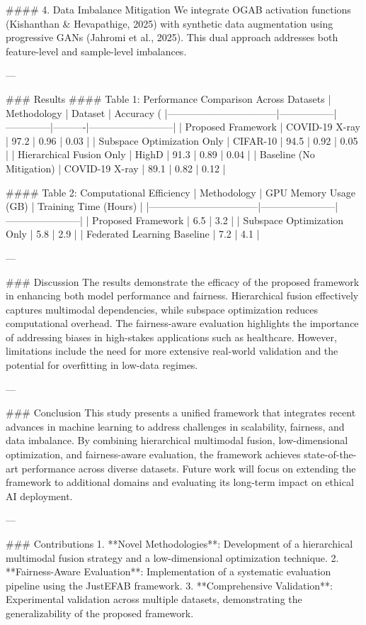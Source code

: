 #### 4. Data Imbalance Mitigation
We integrate OGAB activation functions (Kishanthan & Hevapathige, 2025) with synthetic data augmentation using progressive GANs (Jahromi et al., 2025). This dual approach addresses both feature-level and sample-level imbalances.

---

### Results
#### Table 1: Performance Comparison Across Datasets
| Methodology                     | Dataset         | Accuracy (%
|---------------------------------|-----------------|--------------|----------|--------------------------|
| Proposed Framework              | COVID-19 X-ray | 97.2         | 0.96     | 0.03                    |
| Subspace Optimization Only      | CIFAR-10        | 94.5         | 0.92     | 0.05                    |
| Hierarchical Fusion Only        | HighD           | 91.3         | 0.89     | 0.04                    |
| Baseline (No Mitigation)        | COVID-19 X-ray | 89.1         | 0.82     | 0.12                    |

#### Table 2: Computational Efficiency
| Methodology                     | GPU Memory Usage (GB) | Training Time (Hours) |
|---------------------------------|-----------------------|-----------------------|
| Proposed Framework              | 6.5                   | 3.2                   |
| Subspace Optimization Only      | 5.8                   | 2.9                   |
| Federated Learning Baseline     | 7.2                   | 4.1                   |

---

### Discussion
The results demonstrate the efficacy of the proposed framework in enhancing both model performance and fairness. Hierarchical fusion effectively captures multimodal dependencies, while subspace optimization reduces computational overhead. The fairness-aware evaluation highlights the importance of addressing biases in high-stakes applications such as healthcare. However, limitations include the need for more extensive real-world validation and the potential for overfitting in low-data regimes.

---

### Conclusion
This study presents a unified framework that integrates recent advances in machine learning to address challenges in scalability, fairness, and data imbalance. By combining hierarchical multimodal fusion, low-dimensional optimization, and fairness-aware evaluation, the framework achieves state-of-the-art performance across diverse datasets. Future work will focus on extending the framework to additional domains and evaluating its long-term impact on ethical AI deployment.

---

### Contributions
1. **Novel Methodologies**: Development of a hierarchical multimodal fusion strategy and a low-dimensional optimization technique.
2. **Fairness-Aware Evaluation**: Implementation of a systematic evaluation pipeline using the JustEFAB framework.
3. **Comprehensive Validation**: Experimental validation across multiple datasets, demonstrating the generalizability of the proposed framework.